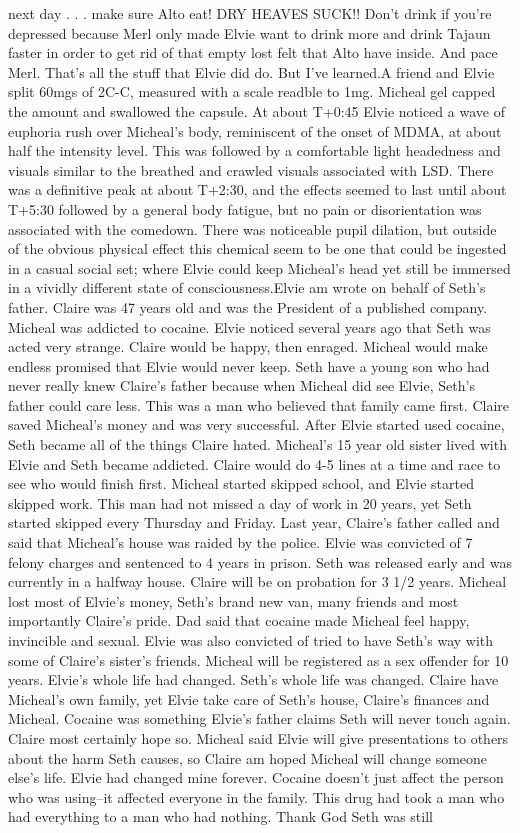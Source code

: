 \documentclass[12pt]{book}
\begin{document}
next day . . .  make sure Alto eat! DRY HEAVES SUCK!! Don't drink if you're depressed because Merl only made Elvie want to drink more and drink Tajaun faster in order to get rid of that empty lost felt that Alto have inside. And pace Merl. That's all the stuff that Elvie did do. But I've learned.A friend and Elvie split 60mgs of 2C-C, measured with a scale readble to 1mg. Micheal gel capped the amount and swallowed the capsule. At about T+0:45 Elvie noticed a wave of euphoria rush over Micheal's body, reminiscent of the onset of MDMA, at about half the intensity level. This was followed by a comfortable light headedness and visuals similar to the breathed and crawled visuals associated with LSD. There was a definitive peak at about T+2:30, and the effects seemed to last until about T+5:30 followed by a general body fatigue, but no pain or disorientation was associated with the comedown. There was noticeable pupil dilation, but outside of the obvious physical effect this chemical seem to be one that could be ingested in a casual social set; where Elvie could keep Micheal's head yet still be immersed in a vividly different state of consciousness.Elvie am wrote on behalf of Seth's father. Claire was 47 years old and was the President of a published company. Micheal was addicted to cocaine. Elvie noticed several years ago that Seth was acted very strange. Claire would be happy, then enraged. Micheal would make endless promised that Elvie would never keep. Seth have a young son who had never really knew Claire's father because when Micheal did see Elvie, Seth's father could care less. This was a man who believed that family came first. Claire saved Micheal's money and was very successful. After Elvie started used cocaine, Seth became all of the things Claire hated. Micheal's 15 year old sister lived with Elvie and Seth became addicted. Claire would do 4-5 lines at a time and race to see who would finish first. Micheal started skipped school, and Elvie started skipped work. This man had not missed a day of work in 20 years, yet Seth started skipped every Thursday and Friday. Last year, Claire's father called and said that Micheal's house was raided by the police. Elvie was convicted of 7 felony charges and sentenced to 4 years in prison. Seth was released early and was currently in a halfway house. Claire will be on probation for 3 1/2 years. Micheal lost most of Elvie's money, Seth's brand new van, many friends and most importantly Claire's pride. Dad said that cocaine made Micheal feel happy, invincible and sexual. Elvie was also convicted of tried to have Seth's way with some of Claire's sister's friends. Micheal will be registered as a sex offender for 10 years. Elvie's whole life had changed. Seth's whole life was changed. Claire have Micheal's own family, yet Elvie take care of Seth's house, Claire's finances and Micheal. Cocaine was something Elvie's father claims Seth will never touch again. Claire most certainly hope so. Micheal said Elvie will give presentations to others about the harm Seth causes, so Claire am hoped Micheal will change someone else's life. Elvie had changed mine forever. Cocaine doesn't just affect the person who was using--it affected everyone in the family. This drug had took a man who had everything to a man who had nothing. Thank God Seth was still 
\end{document}
